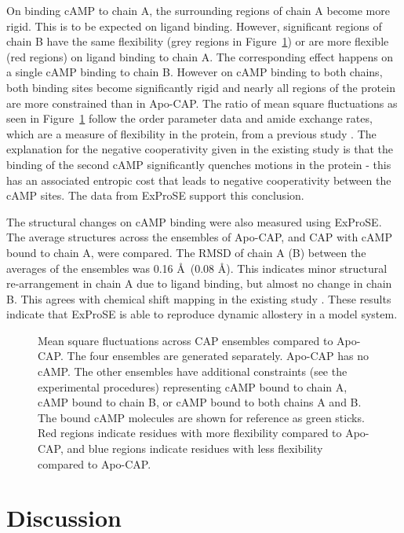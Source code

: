 On binding cAMP to chain A, the surrounding regions of chain A become more rigid.
This is to be expected on ligand binding.
However, significant regions of chain B have the same flexibility (grey regions in Figure~\ref{fig:cap}) or are more flexible (red regions) on ligand binding to chain A.
The corresponding effect happens on a single cAMP binding to chain B.
However on cAMP binding to both chains, both binding sites become significantly rigid and nearly all regions of the protein are more constrained than in Apo-CAP.
The ratio of mean square fluctuations as seen in Figure~\ref{fig:cap} follow the order parameter data and amide exchange rates, which are a measure of flexibility in the protein, from a previous study \cite{Popovych2006}.
The explanation for the negative cooperativity given in the existing study is that the binding of the second cAMP significantly quenches motions in the protein - this has an associated entropic cost that leads to negative cooperativity between the cAMP sites.
The data from ExProSE support this conclusion.

The structural changes on cAMP binding were also measured using ExProSE.
The average structures across the ensembles of Apo-CAP, and CAP with cAMP bound to chain A, were compared.
The RMSD of chain A (B) between the averages of the ensembles was 0.16 \AA\ (0.08 \AA).
This indicates minor structural re-arrangement in chain A due to ligand binding, but almost no change in chain B.
This agrees with chemical shift mapping in the existing study \cite{Popovych2006}.
These results indicate that ExProSE is able to reproduce dynamic allostery in a model system.


\begin{figure}
\centering


\caption{Mean square fluctuations across CAP ensembles compared to Apo-CAP.
The four ensembles are generated separately.
Apo-CAP has no cAMP.
The other ensembles have additional constraints (see the experimental procedures) representing cAMP bound to chain A, cAMP bound to chain B, or cAMP bound to both chains A and B.
The bound cAMP molecules are shown for reference as green sticks.
Red regions indicate residues with more flexibility compared to Apo-CAP, and blue regions indicate residues with less flexibility compared to Apo-CAP.}

\label{fig:cap}
\end{figure}


\section{Discussion}

